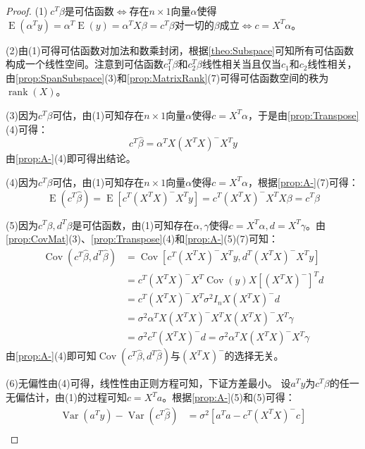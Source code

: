\begin{proof}
	(1)$\;c^T\beta$是可估函数$\Leftrightarrow$存在$n\times1$向量$\alpha$使得$\operatorname{E}(\alpha^Ty)=\alpha^T\operatorname{E}(y)=\alpha^TX\beta=c^T\beta$对一切的$\beta$成立$\Leftrightarrow c=X^T\alpha$。\par
	(2)由(1)可得可估函数对加法和数乘封闭，根据\cref{theo:Subspace}可知所有可估函数构成一个线性空间。注意到可估函数$c_1^T\beta$和$c_2^T\beta$线性相关当且仅当$c_1$和$c_2$线性相关，由\cref{prop:SpanSubspace}(3)和\cref{prop:MatrixRank}(7)可得可估函数空间的秩为$\operatorname{rank}(X)$。\par
	(3)因为$c^T\beta$可估，由(1)可知存在$n\times 1$向量$\alpha$使得$c=X^T\alpha$，于是由\cref{prop:Transpose}(4)可得：
	\begin{equation*}
		c^T\hat{\beta}=\alpha^TX(X^TX)^-X^Ty
	\end{equation*}
	由\cref{prop:A-}(4)即可得出结论。\par
	(4)因为$c^T\beta$可估，由(1)可知存在$n\times 1$向量$\alpha$使得$c=X^T\alpha$，根据\cref{prop:A-}(7)可得：
	\begin{equation*}
		\operatorname{E}(c^T\hat{\beta})=\operatorname{E}[c^T(X^TX)^-X^Ty]=c^T(X^TX)^-X^TX\beta=c^T\beta
	\end{equation*}\par
	(5)因为$c^T\beta,d^T\beta$是可估函数，由(1)可知存在$\alpha,\gamma$使得$c=X^T\alpha,d=X^T\gamma$。由\cref{prop:CovMat}(3)、\cref{prop:Transpose}(4)和\cref{prop:A-}(5)(7)可知：
	\begin{align*}
		\operatorname{Cov}(c^T\hat{\beta},d^T\hat{\beta})
		&=\operatorname{Cov}[c^T(X^TX)^-X^Ty,d^T(X^TX)^-X^Ty] \\
		&=c^T(X^TX)^-X^T\operatorname{Cov}(y)X[(X^TX)^-]^Td \\
		&=c^T(X^TX)^-X^T\sigma^2I_nX(X^TX)^-d \\
		&=\sigma^2\alpha^TX(X^TX)^-X^TX(X^TX)^-X^T\gamma \\
		&=\sigma^2c^T(X^TX)^-d=\sigma^2\alpha^TX(X^TX)^-X^T\gamma
	\end{align*}
	由\cref{prop:A-}(4)即可知$\operatorname{Cov}(c^T\hat{\beta},d^T\hat{\beta})$与$(X^TX)^-$的选择无关。\par
	(6)无偏性由(4)可得，线性性由正则方程可知，下证方差最小。
	设$a^Ty$为$c^T\beta$的任一无偏估计，由(1)的过程可知$c=X^Ta$。根据\cref{prop:A-}(5)和(5)可得：
	\begin{align*}
		\operatorname{Var}(a^Ty)-\operatorname{Var}(c^T\hat{\beta})&=\sigma^2[a^Ta-c^T(X^TX)^-c] \\

\end{align*}
\end{proof}
